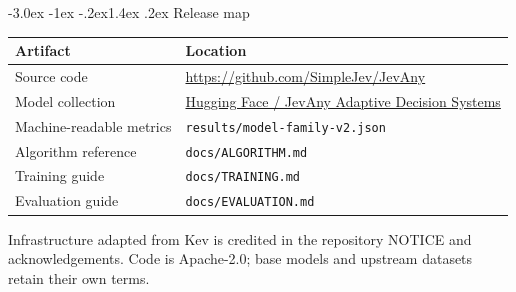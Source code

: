 \documentclass[10pt]{article}
\makeatletter
\renewcommand\section{\@startsection{section}{1}{\z@}%
  {-3.0ex \@plus -1ex \@minus -.2ex}{1.4ex \@plus .2ex}%
  {\color{navy}\Large\bfseries}}
\makeatother
\begin{document}
\section{Release map}

\begin{tabular}{p{.25\linewidth}p{.66\linewidth}}
\toprule
Artifact & Location \\
\midrule
Source code & \url{https://github.com/SimpleJev/JevAny} \\
Model collection & \href{https://huggingface.co/collections/SimpleJev/jevany-adaptive-decision-systems-6abc8fd39266b1c17b11b4e6}{Hugging Face / JevAny Adaptive Decision Systems} \\
Machine-readable metrics & \texttt{results/model-family-v2.json} \\
Algorithm reference & \texttt{docs/ALGORITHM.md} \\
Training guide & \texttt{docs/TRAINING.md} \\
Evaluation guide & \texttt{docs/EVALUATION.md} \\
\bottomrule
\end{tabular}

\vfill
\begin{center}
\color{muted}\small
Infrastructure adapted from Kev is
credited in the repository NOTICE and acknowledgements. Code is Apache-2.0;
base models and upstream datasets retain their own terms.
\end{center}
\end{document}
